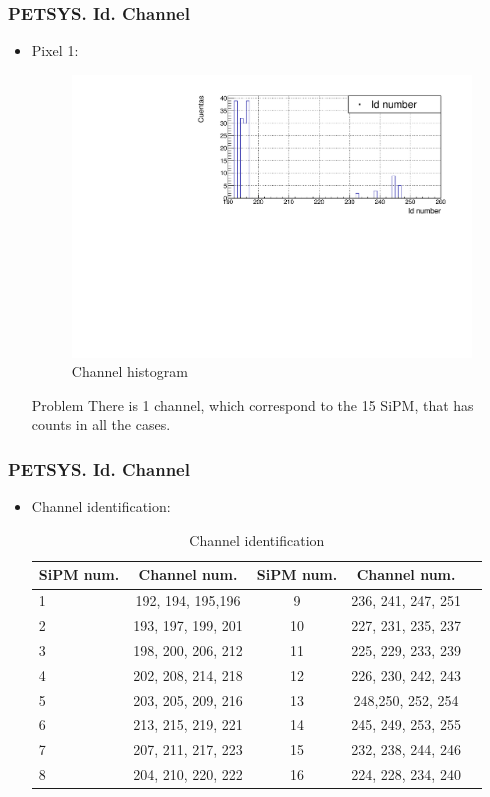 \documentclass{beamer}
\begin{document}
\begin{frame}
\frametitle{PETSYS. Id. Channel}
\begin{itemize}
\item{} Pixel 1:

\begin{figure}[hbtp]
\centering
\includegraphics[scale=0.4]{PETSYS/Id_channel/Channel_pixel_1.pdf}
\caption{Channel histogram}
\end{figure}

\begin{alertblock}{Problem}
There is 1 channel, which correspond to the 15 SiPM, that has counts in all the cases.
\end{alertblock}

\end{itemize}

\end{frame}

\begin{frame}
\frametitle{PETSYS. Id. Channel}
\begin{itemize}
\item{} Channel identification:

\begin{table}
\begin{tabular}{l | c | c | c | c }
SiPM num. & Channel num. & SiPM num. & Channel num. \\
\hline \hline
1 & 192, 194, 195,196 & 9 & 236, 241, 247, 251 \\ 
2 & 193, 197, 199, 201 & 10 & 227, 231, 235, 237\\
3 & 198, 200, 206, 212 & 11 & 225, 229, 233, 239\\
4 & 202, 208, 214, 218 & 12 & 226, 230, 242, 243 \\
5 & 203, 205, 209, 216 & 13 & 248,250, 252, 254 \\ 
6 & 213, 215, 219, 221 & 14 & 245, 249, 253, 255 \\
7 & 207, 211, 217, 223 & 15 & 232, 238, 244, 246 \\
8 & 204, 210, 220, 222 & 16 & 224, 228, 234, 240   
\end{tabular}
\caption{Channel identification}
\end{table}

\end{itemize}

\end{frame}
\end{document}
